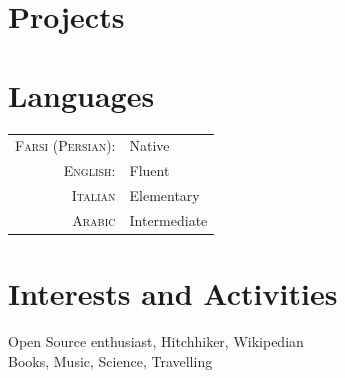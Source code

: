 \documentclass[a4paper,10pt]{article}
\begin{document}
\section{Projects}


\section{Languages}
\begin{tabular}{rl}
	\textsc{Farsi (Persian):}&Native\\
    \textsc{English:}&Fluent\\
    \textsc{Italian}& Elementary\\
    \textsc{Arabic}& Intermediate
\end{tabular}

\section{Interests and Activities}
Open Source enthusiast, Hitchhiker, Wikipedian\\
Books, Music, Science, Travelling
\end{document}
